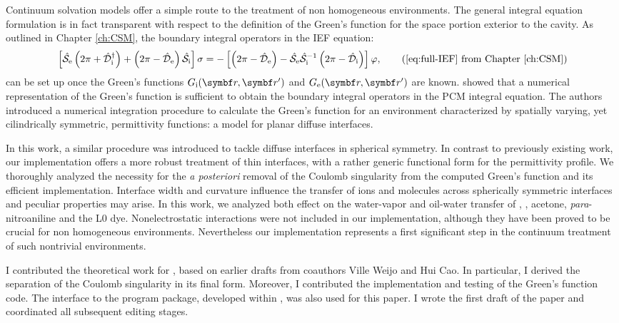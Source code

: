 Continuum solvation models offer a simple route to the treatment of non
homogeneous environments.
The general integral equation formulation is in fact transparent with respect
to the definition of the Green's function for the space portion exterior to the
cavity.
As outlined in Chapter \ref{ch:CSM}, the boundary integral operators in the
\acrshort{IEF} equation:
\begin{equation}
  \left[ \bi{S}_\mathrm{e}\left(2\pi + \bi{D}^\dagger_\mathrm{i}\right)
  +
  \left(2\pi - \bi{D}_\mathrm{e}\right)\bi{S}_\mathrm{i}
  \right]\sigma =
  -\left[\left(2\pi-\bi{D}_\mathrm{e}\right)
  -\bi{S}_\mathrm{e}\bi{S}_\mathrm{i}^{-1}
  \left(2\pi-\bi{D}_\mathrm{i}\right)
  \right]\esp,
  \tag{\ref{eq:full-IEF} from Chapter \ref{ch:CSM}}
\end{equation}
can be set up once the Green's functions $\Gi$ and $\Ge$ are known.\autocite{Cances1998-og}
\citeauthor{Frediani2004-er} showed that a numerical representation of the
Green's function is sufficient to obtain the boundary integral operators in the
\acrshort{PCM} integral equation.
The authors introduced a numerical integration procedure to calculate the
Green's function for an environment characterized by spatially varying, yet
cilindrically symmetric, permittivity functions: a model for planar diffuse interfaces.

In this work, a similar procedure was introduced to tackle diffuse interfaces
in spherical symmetry.
In contrast to previously existing work, our implementation offers a more robust
treatment of thin interfaces, with a rather generic functional form for the
permittivity profile.
We thoroughly analyzed the necessity for the \emph{a posteriori} removal of the
Coulomb singularity from the computed Green's function and its efficient
implementation.
Interface width and curvature influence the transfer of ions and molecules across
spherically symmetric interfaces and peculiar properties may arise.
In this work, we analyzed both effect on the water-vapor and oil-water transfer
of , , acetone, \emph{para}-nitroaniline and the L0 dye.
Nonelectrostatic interactions were not included in our implementation, although
they have been proved to be crucial for non homogeneous
environments.\autocite{Mozgawa2014-ad}
Nevertheless our implementation represents a first significant step in the continuum treatment
of such nontrivial environments.

I contributed the theoretical work for , based on earlier drafts from coauthors
Ville Weijo and Hui Cao. In particular, I derived the separation of
the Coulomb singularity in its final form.
Moreover, I contributed the implementation and testing of the Green's function code.
The interface to the \LSDALTON program package, developed within
, was
also used for this paper.
I wrote the first draft of the paper and coordinated all subsequent editing stages.

